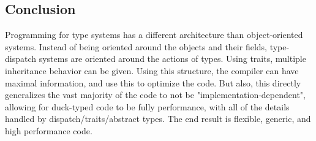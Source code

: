 \documentclass[11pt]{article}
\begin{document}
    \subsection{Conclusion}\label{conclusion}

Programming for type systems has a different architecture than
object-oriented systems. Instead of being oriented around the objects
and their fields, type-dispatch systems are oriented around the actions
of types. Using traits, multiple inheritance behavior can be given.
Using this structure, the compiler can have maximal information, and use
this to optimize the code. But also, this directly generalizes the vast
majority of the code to not be "implementation-dependent", allowing for
duck-typed code to be fully performance, with all of the details handled
by dispatch/traits/abstract types. The end result is flexible, generic,
and high performance code.


    
    
    
    
\end{document}
